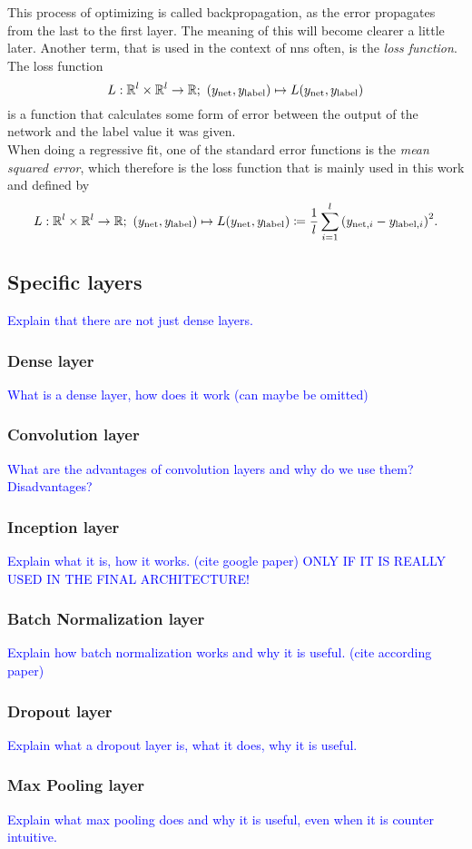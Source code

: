 This process of optimizing is called backpropagation, as the error propagates from the last to the first layer. The meaning of this will become clearer a little later. Another term, that is used in the context of \gls{nns} often, is the \emph{loss function}. The loss function
\begin{equation}\label{def:genratl_loss}
L:\mathbb{R}^l\times\mathbb{R}^l\to\mathbb{R};\ (y_\text{net}, y_\text{label})\mapsto L(y_\text{net}, y_\text{label})
\end{equation}
is a function that calculates some form of error between the output of the network and the label value it was given.\\
When doing a regressive fit, one of the standard error functions is the \emph{mean squared error}, which therefore is the loss function that is mainly used in this work and defined by
\begin{equation}\label{def:loss_mean_squared_error}
L:\mathbb{R}^l\times\mathbb{R}^l\to\mathbb{R};\ (y_\text{net}, y_\text{label})\mapsto L(y_\text{net}, y_\text{label})\coloneqq\frac{1}{l}\sum_{i=1}^l{(y_{\text{net},i}-y_{\text{label},i})}^2.
\end{equation}

\subsection{Specific layers}
\textcolor{blue}{Explain that there are not just dense layers.}
\subsubsection{Dense layer}
\textcolor{blue}{What is a dense layer, how does it work (can maybe be omitted)}
\subsubsection{Convolution layer}
\textcolor{blue}{What are the advantages of convolution layers and why do we use them? Disadvantages?}
\subsubsection{Inception layer}
\textcolor{blue}{Explain what it is, how it works. (cite google paper) ONLY IF IT IS REALLY USED IN THE FINAL ARCHITECTURE!}
\subsubsection{Batch Normalization layer}
\textcolor{blue}{Explain how batch normalization works and why it is useful. (cite according paper)}
\subsubsection{Dropout layer}
\textcolor{blue}{Explain what a dropout layer is, what it does, why it is useful.}
\subsubsection{Max Pooling layer}
\textcolor{blue}{Explain what max pooling does and why it is useful, even when it is counter intuitive.}